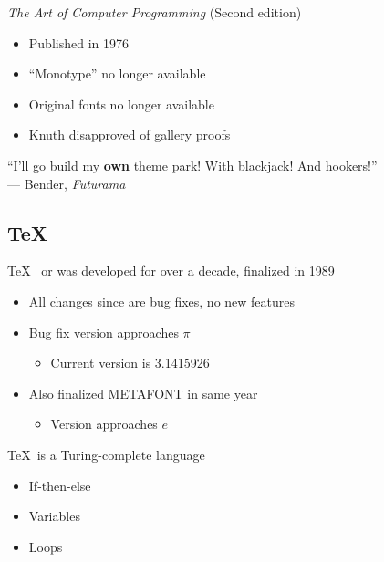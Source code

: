 \documentclass{beamer}                  %
\newcommand{\srule}{
	\rule{\textwidth}{1pt}\\
}
\newlength{\subsecwidth}
\newenvironment{slide}{
	\begin{frame} %
	\settowidth{\subsecwidth}{\insertsubsection} %
	\ifthenelse{\dimtest{\subsecwidth}{<}{1pt}}{ %
		\frametitle{\insertsection\\             %
		\vspace{-1ex}                            %
		\color{fore}\srule                       %
		\par                                     %
		\vspace{-3ex}                            %
		}
	}{                                           %
		\frametitle{\insertsection\ -- \insertsubsection\\ %
		\vspace{-1ex}                            %
		\color{fore}\srule                       %
		\par                                     %
		\vspace{-3ex}                            %
		}
	}
	\Large                                       %
}{
	\end{frame}
}
\newcommand{\mediatitle}[1]{\textit{#1}}  %
\begin{document}
\begin{slide}
	\mediatitle{The Art of Computer Programming} (Second edition)
	\begin{itemize}
		\item Published in 1976
		\item ``Monotype'' no longer available
		\item Original fonts no longer available
		\item Knuth disapproved of gallery proofs
	\end{itemize}
\end{slide}

\begin{slide}
	``I'll go build my \textbf{own} theme park!  With blackjack!
	And hookers!''\\
	\bigskip      %
	\hspace{1em}  %
	--- Bender, \mediatitle{Futurama}
\end{slide}

\subsection{\TeX} %
\begin{slide}
	\TeX~ or  was developed for over a decade,
	finalized in 1989 \label{ipa2}
	\begin{itemize}
		\item All changes since are bug fixes, no new features
		\item Bug fix version approaches $\pi$
		\begin{itemize}
			\item Current version is 3.1415926
		\end{itemize}
		\item Also finalized METAFONT in same year
		\begin{itemize}
			\item Version approaches $e$
		\end{itemize}
	\end{itemize}
\end{slide}

\begin{slide}
	\TeX\ is a Turing-complete language
	\begin{itemize}
		\item If-then-else
		\item Variables
		\item Loops
	\end{itemize}
\end{slide}
\end{document}
